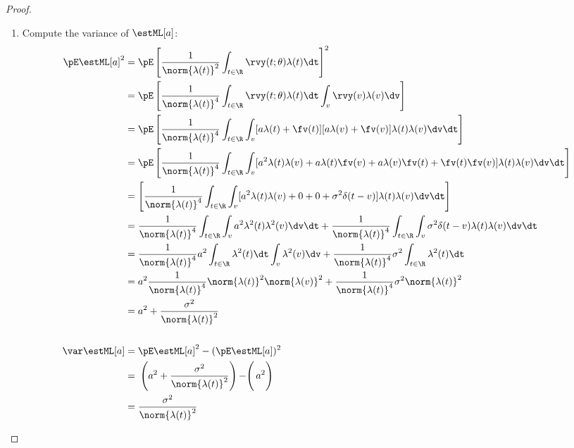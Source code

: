 \begin{proof}
\begin{enumerate}
\item Compute the variance of $\estML[a]$:
\begin{align*}
  \pE \estML[a]^2
    &= \pE \left[ \frac{1}{\norm{\lambda(t)}^2} \int_{t\in\R} \rvy(t;\theta)\lambda(t) \dt\right]^2
  \\&= \pE \left[  \frac{1}{\norm{\lambda(t)}^4}
        \int_{t\in\R} \rvy(t;\theta)\lambda(t) \dt \int_v \rvy(v)\lambda(v) \dv
        \right]
  \\&= \pE \left[  \frac{1}{\norm{\lambda(t)}^4}
        \int_{t\in\R} \int_v [a\lambda(t) + \fv(t)][a\lambda(v) + \fv(v)]
        \lambda(t) \lambda(v)
        \dv\dt \right]
  \\&= \pE \left[  \frac{1}{\norm{\lambda(t)}^4}
        \int_{t\in\R} \int_v
        [a^2\lambda(t)\lambda(v) + a\lambda(t)\fv(v) + a\lambda(v)\fv(t) + \fv(t)\fv(v)]
        \lambda(t) \lambda(v)
        \dv\dt \right]
  \\&= \left[  \frac{1}{\norm{\lambda(t)}^4}
        \int_{t\in\R} \int_v
        [a^2\lambda(t)\lambda(v) + 0 + 0 + \sigma^2\delta(t-v)]
        \lambda(t) \lambda(v)
        \dv\dt \right]
  \\&= \frac{1}{\norm{\lambda(t)}^4}
        \int_{t\in\R} \int_v a^2\lambda^2(t)\lambda^2(v) \dv\dt +
        \frac{1}{\norm{\lambda(t)}^4}
        \int_{t\in\R} \int_v \sigma^2\delta(t-v) \lambda(t) \lambda(v) \dv\dt
  \\&= \frac{1}{\norm{\lambda(t)}^4}
        a^2 \int_{t\in\R} \lambda^2(t) \dt \int_v \lambda^2(v) \dv +
        \frac{1}{\norm{\lambda(t)}^4}
        \sigma^2\int_{t\in\R} \lambda^2(t) \dt
  \\&= a^2 \frac{1}{\norm{\lambda(t)}^4}
        \norm{\lambda(t)}^2 \norm{\lambda(v)}^2 +
        \frac{1}{\norm{\lambda(t)}^4}
        \sigma^2 \norm{\lambda(t)}^2
  \\&= a^2 + \frac{\sigma^2}{\norm{\lambda(t)}^2}
\\
\\
  \var\estML[a]
    &= \pE \estML[a]^2 - (\pE \estML[a])^2
  \\&= \left.\left.\left(a^2 + \frac{\sigma^2}{\norm{\lambda(t)}^2}\right) - \right( a^2 \right)
  \\&= \frac{\sigma^2}{\norm{\lambda(t)}^2}
\end{align*}


\end{enumerate}
\end{proof}

